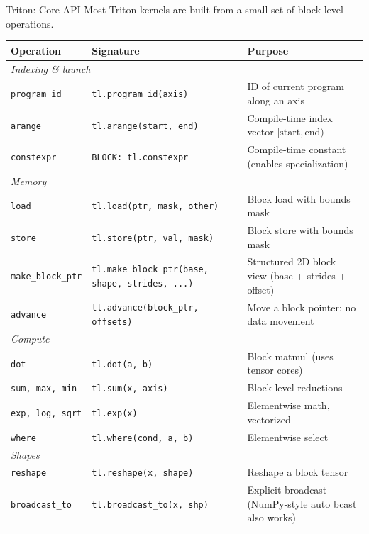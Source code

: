 \begin{frame}{Triton: Core API}
  Most Triton kernels are built from a small set of block-level operations.

  \vspace{0.3em}
  \begin{center}
  {\scriptsize
  \begin{tabular}{lll}
    \toprule
    \textbf{Operation} & \textbf{Signature} & \textbf{Purpose} \\
    \midrule
    \multicolumn{3}{l}{\textit{Indexing \& launch}} \\
    \texttt{program\_id} & \texttt{tl.program\_id(axis)} & ID of current program along an axis \\
    \texttt{arange} & \texttt{tl.arange(start, end)} & Compile-time index vector $[\text{start}, \text{end})$ \\
    \texttt{constexpr} & \texttt{BLOCK: tl.constexpr} & Compile-time constant (enables specialization) \\
    \midrule
    \multicolumn{3}{l}{\textit{Memory}} \\
    \texttt{load} & \texttt{tl.load(ptr, mask, other)} & Block load with bounds mask \\
    \texttt{store} & \texttt{tl.store(ptr, val, mask)} & Block store with bounds mask \\
    \texttt{make\_block\_ptr} & \texttt{tl.make\_block\_ptr(base, shape, strides, ...)} & Structured 2D block view (base + strides + offset) \\
    \texttt{advance} & \texttt{tl.advance(block\_ptr, offsets)} & Move a block pointer; no data movement \\
    \midrule
    \multicolumn{3}{l}{\textit{Compute}} \\
    \texttt{dot} & \texttt{tl.dot(a, b)} & Block matmul (uses tensor cores) \\
    \texttt{sum, max, min} & \texttt{tl.sum(x, axis)} & Block-level reductions \\
    \texttt{exp, log, sqrt} & \texttt{tl.exp(x)} & Elementwise math, vectorized \\
    \texttt{where} & \texttt{tl.where(cond, a, b)} & Elementwise select \\
    \midrule
    \multicolumn{3}{l}{\textit{Shapes}} \\
    \texttt{reshape} & \texttt{tl.reshape(x, shape)} & Reshape a block tensor \\
    \texttt{broadcast\_to} & \texttt{tl.broadcast\_to(x, shp)} & Explicit broadcast (NumPy-style auto bcast also works) \\
    \bottomrule
  \end{tabular}
  }
  \end{center}


\end{frame}
